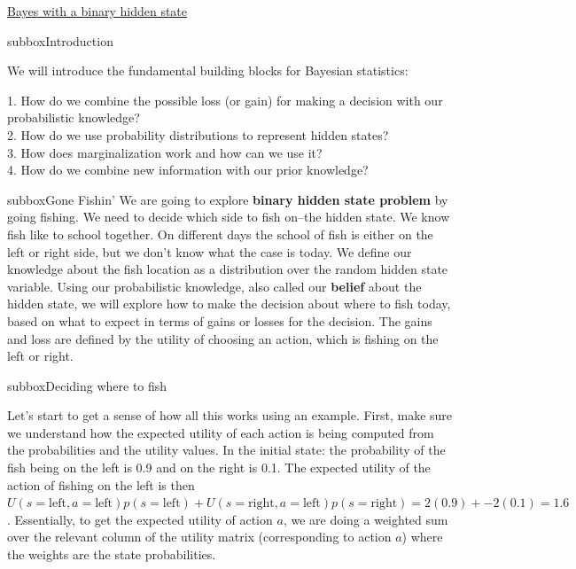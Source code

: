 \clearpage
\begin{textbox}{\href{https://compneuro.neuromatch.io/tutorials/W3D1_BayesianDecisions/student/W3D1_Tutorial1.html}{Bayes with a binary hidden state } }
\begin{subbox}{subbox}{Introduction}
\scriptsize

We will introduce the fundamental building blocks for Bayesian statistics: 

1. How do we combine the possible loss (or gain) for making a decision with our probabilistic knowledge?\\
2. 
 How do we use probability distributions to represent hidden states?\\
3. How does marginalization work and how can we use it?\\
 4. How do we combine new information with our prior knowledge? 

\end{subbox}

\begin{subbox}{subbox}{Gone Fishin'}
\scriptsize
We are going to explore \textbf{binary hidden state problem} by going fishing. We need to decide which side to fish on--the hidden state. We know fish like to school together. On different days the school of fish is either on the left or right side, but we don’t know what the case is today. We define our knowledge about the fish location as a distribution over the random hidden state variable. Using our probabilistic knowledge, also called our \textbf{belief} about the hidden state, we will explore how to make the decision about where to fish today, based on what to expect in terms of gains or losses for the decision.
The gains and loss are defined by the utility of choosing an action, which is fishing on the left or right. 

\end{subbox}
\begin{subbox}{subbox}{Deciding where to fish}
\scriptsize

Let's start to get a sense of how all this works using an example. First, make sure we understand how the expected utility of each action is being computed from the probabilities and the utility values. In the initial state: the probability of the fish being on the left is 0.9 and on the right is 0.1. The expected utility of the action of fishing on the left is then $U(s = \textrm{left},a = \textrm{left})p(s = \textrm{left}) + U(s = \textrm{right},a = \textrm{left})p(s = \textrm{right}) = 2(0.9) + -2(0.1) = 1.6$. Essentially, to get the expected utility of action $a$, we are doing a weighted sum over the relevant column of the utility matrix (corresponding to action $a$) where the weights are the state probabilities.


\end{subbox}
\end{textbox}

